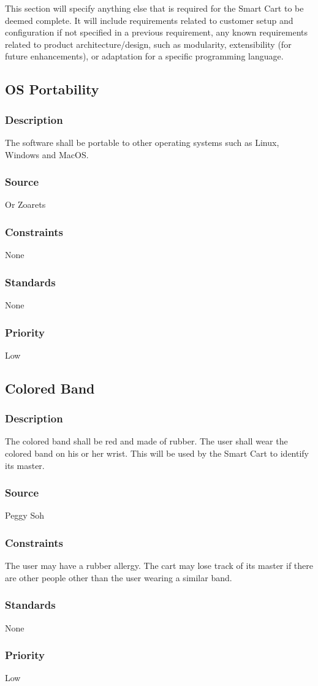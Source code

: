 This section will specify anything else that is required for the Smart Cart to be deemed complete. It will include requirements related to customer setup and configuration if not specified in a previous requirement, any known requirements related to product architecture/design, such as modularity, extensibility (for future enhancements), or adaptation for a specific programming language.

\subsection{OS Portability}
\subsubsection{Description}
The software shall be portable to other operating systems such as Linux, Windows and MacOS. 
\subsubsection{Source}
Or Zoarets
\subsubsection{Constraints}
None
\subsubsection{Standards}
None
\subsubsection{Priority}
Low


\subsection{Colored Band}
\subsubsection{Description}
The colored band shall be red and made of rubber. The user shall wear the colored band on his or her wrist. This will be used by the Smart Cart to identify its master. 
\subsubsection{Source}
Peggy Soh
\subsubsection{Constraints}
The user may have a rubber allergy. The cart may lose track of its master if there are other people other than the user wearing a similar band.
\subsubsection{Standards}
None
\subsubsection{Priority}
Low
